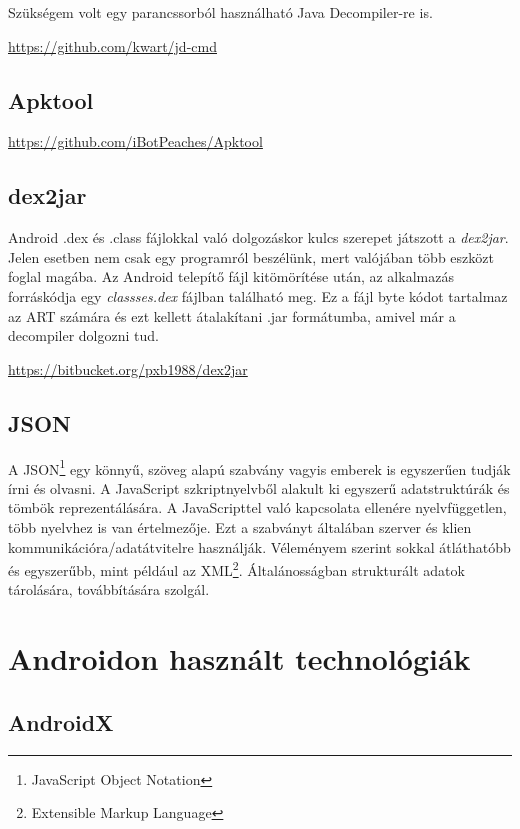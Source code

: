 \documentclass{thesis-ekf}
\theoremstyle{definition}
\theoremstyle{remark}
\begin{document}
Szükségem volt egy parancssorból használható Java Decompiler-re is. 

\url{https://github.com/kwart/jd-cmd}

\subsection{Apktool}

\url{https://github.com/iBotPeaches/Apktool}

\subsection{dex2jar}

Android .dex és .class fájlokkal való dolgozáskor kulcs szerepet játszott a \emph{dex2jar}. Jelen esetben nem csak egy programról beszélünk, mert valójában több eszközt foglal magába.
Az Android telepítő fájl kitömörítése után, az alkalmazás forráskódja egy \emph{classses.dex} fájlban található meg.
Ez a fájl byte kódot tartalmaz az ART számára és ezt kellett átalakítani .jar formátumba, amivel már a decompiler dolgozni tud.

\url{https://bitbucket.org/pxb1988/dex2jar}

\subsection{JSON}

A JSON\footnote{JavaScript Object Notation} egy könnyű, szöveg alapú szabvány vagyis emberek is egyszerűen tudják írni és olvasni.
A JavaScript szkriptnyelvből alakult ki egyszerű adatstruktúrák és tömbök reprezentálására. 
A JavaScripttel való kapcsolata ellenére nyelvfüggetlen, több nyelvhez is van értelmezője. 
Ezt a szabványt általában szerver és klien kommunikációra/adatátvitelre használják.
Véleményem szerint sokkal átláthatóbb és egyszerűbb, mint például az XML\footnote{Extensible Markup Language}.
Általánosságban strukturált adatok tárolására, továbbítására szolgál. \cite{json}


\section{Androidon használt technológiák}

\subsection{AndroidX}
\end{document}

